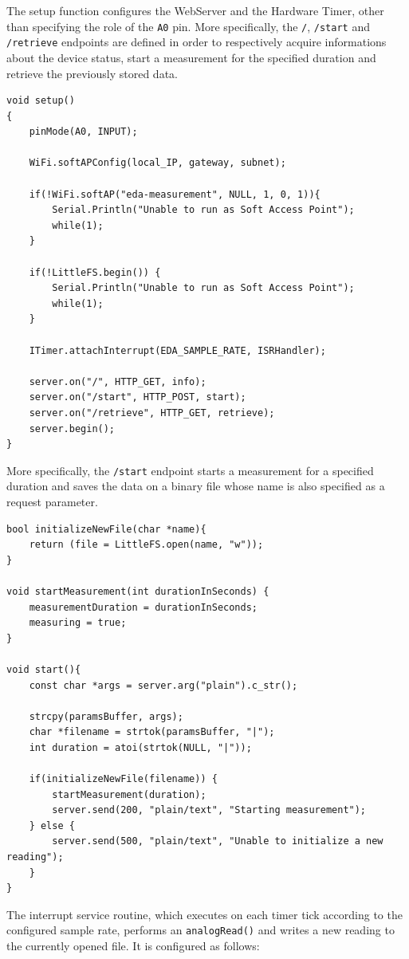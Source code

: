 \vspace{3mm}

The setup function configures the WebServer and the Hardware Timer, other than specifying the role of the \texttt{A0} pin. More specifically, the \texttt{/}, \texttt{/start} and \texttt{/retrieve} endpoints are defined in order to respectively acquire informations about the device status, start a measurement for the specified duration and retrieve the previously stored data.

\begin{verbatim}
void setup() 
{
    pinMode(A0, INPUT);

    WiFi.softAPConfig(local_IP, gateway, subnet);
    
    if(!WiFi.softAP("eda-measurement", NULL, 1, 0, 1)){
        Serial.Println("Unable to run as Soft Access Point");
        while(1);
    }

    if(!LittleFS.begin()) {
        Serial.Println("Unable to run as Soft Access Point");
        while(1);
    }

    ITimer.attachInterrupt(EDA_SAMPLE_RATE, ISRHandler);

    server.on("/", HTTP_GET, info);
    server.on("/start", HTTP_POST, start);
    server.on("/retrieve", HTTP_GET, retrieve);
    server.begin();
}
\end{verbatim}

More specifically, the \texttt{/start} endpoint starts a measurement for a specified duration and saves the data on a binary file whose name is also specified as a request parameter.

\begin{verbatim}
bool initializeNewFile(char *name){
    return (file = LittleFS.open(name, "w"));
}

void startMeasurement(int durationInSeconds) {
    measurementDuration = durationInSeconds;
    measuring = true;
}

void start(){
    const char *args = server.arg("plain").c_str();

    strcpy(paramsBuffer, args);
    char *filename = strtok(paramsBuffer, "|");
    int duration = atoi(strtok(NULL, "|"));

    if(initializeNewFile(filename)) {
        startMeasurement(duration);
        server.send(200, "plain/text", "Starting measurement");
    } else {
        server.send(500, "plain/text", "Unable to initialize a new reading");
    }
}
\end{verbatim}

The interrupt service routine, which executes on each timer tick according to the configured sample rate, performs an \texttt{analogRead()} and writes a new reading to the currently opened file. It is configured as follows:

